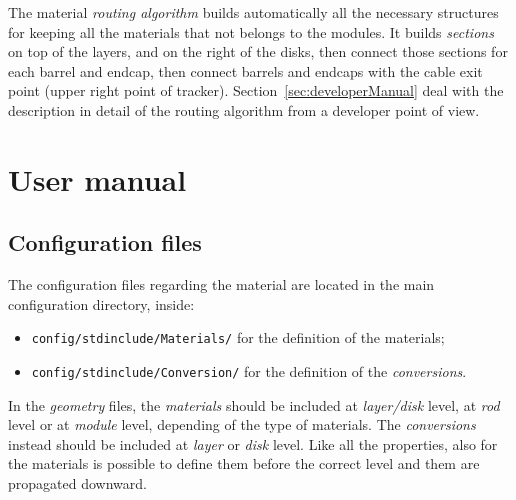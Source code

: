 \documentclass[12pt, a4paper]{article}
\newcommand{\pat}[1]{\texttt{#1}}
\begin{document}
The material \emph{routing algorithm} builds automatically all the necessary structures for
keeping all the materials that not belongs to the modules. It builds
\emph{sections} on top of the layers, and on the right of the disks,
then connect those sections for each barrel and endcap, then connect
barrels and endcaps with the cable exit point (upper right point of
tracker). Section~\ref{sec:developerManual} deal with the description
in detail of the routing algorithm from a developer point of view.




\section{User manual}\label{sec:userManual}
\subsection{Configuration files}
The configuration files regarding the material are located in the main
configuration directory, inside:
\begin{itemize}
\item \pat{config/stdinclude/Materials/} for the definition of the
  materials;
\item \pat{config/stdinclude/Conversion/} for the definition of the
  \emph{conversions}.
\end{itemize}

In the \emph{geometry} files, the \emph{materials} should be included
at \emph{layer/disk} level, at \emph{rod} level or at \emph{module}
level, depending of the type of materials. The \emph{conversions}
instead should be included at \emph{layer} or \emph{disk} level. Like
all the properties, also for the materials is possible to define them before
the correct level and them are propagated downward.
\end{document}
